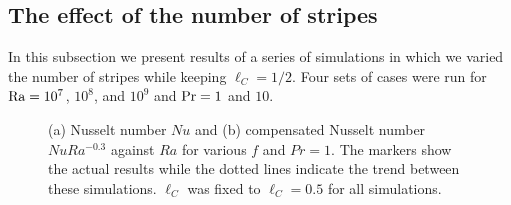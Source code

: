 \subsection{The effect of the number of stripes}\label{NumberofStripes}%
In this subsection we present results of a series of simulations in which we
varied the number of stripes while keeping $\ell_C = 1/2$. Four sets of cases
were run for $\text{Ra} = 10^7$, $10^8$, and $10^9$ and $\text{Pr} = 1$ and $10$.
%
%
\begin{figure}
\centering
{}
\caption{%
(a) Nusselt number $Nu$  and (b)
compensated Nusselt number $NuRa^{-0.3}$  against $Ra$ for various $f$ and
$Pr=1$. The markers show the actual results while the dotted lines
indicate the trend between these simulations. $\ell_C$ was fixed to
$\ell_C=0.5$ for all simulations.}
\label{figure:raVSnusboth}%
\end{figure}%

